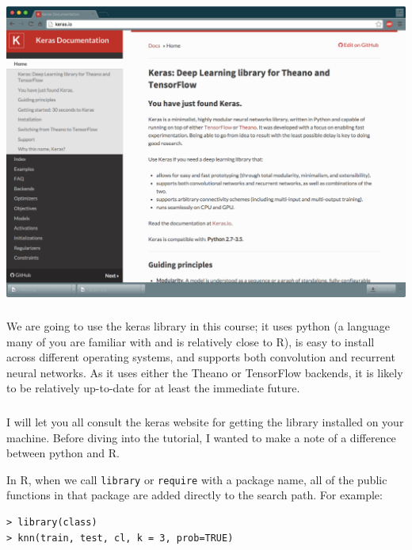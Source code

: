 \documentclass[xetex,mathserif,serif,aspectratio=169]{beamer}
\begin{document}
\begin{frame}[fragile] \frametitle{} \oldB \small

\includegraphics[width=\textwidth]{img/keras.pdf}

\end{frame}

\begin{frame}[fragile] \frametitle{} \oldB \small

\textbf{}

We are going to use the keras library in this course;
it uses python (a language many of you are familiar with
and is relatively close to R), is easy to install across
different operating systems, and supports both convolution
and recurrent neural networks. As it uses either the Theano
or TensorFlow backends, it is likely to be relatively up-to-date for at
least the immediate future.

\end{frame}

\begin{frame}[fragile] \frametitle{} \oldB \small

\textbf{}

I will let you all consult the keras website for getting
the library installed on your machine. Before diving into
the tutorial, I wanted to make a note of a difference
between python and R.

In R, when we call \texttt{library} or \texttt{require}
with a package name, all of the public functions in that
package are added directly to the search path. For example:
\begin{verbatim}
> library(class)
> knn(train, test, cl, k = 3, prob=TRUE)
\end{verbatim}

\end{frame}
\end{document}
